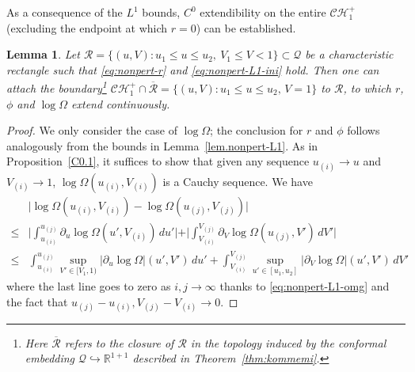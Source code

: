 \documentclass[10pt, reqno]{amsart}
\newtheorem{lemma}[theorem]{Lemma}
\theoremstyle{definition}
\theoremstyle{remark}
\numberwithin{equation}{section}
\newcommand{\abs}[1]{\vert#1\vert}
\newcommand{\set}[1]{\{#1\}}
\newcommand{\rd}{\partial}
\newcommand{\0}{\emptyset}
\newcommand{\Omg}{\Omega}
\newcommand{\bbR}{\mathbb R}
\newcommand{\calC}{\mathcal C}
\newcommand{\calH}{\mathcal H}
\newcommand{\calQ}{\mathcal Q}
\newcommand{\calR}{\mathcal R}
\newcommand{\CH}{\calC \calH^{+}}		%
\begin{document}
As a consequence of the $L^{1}$ bounds, $C^{0}$ extendibility on the entire $\CH_{1}$ (excluding the endpoint at which $r = 0$) can be established.
\begin{lemma} \label{lem.nonpert-C0}
Let $\calR = \set{(u, V) : u_{1} \leq u \leq u_{2}, \ V_{1} \leq V < 1} \subset \calQ$ be a characteristic rectangle such that \eqref{eq:nonpert-r} and \eqref{eq:nonpert-L1-ini} hold. Then one can attach the boundary\footnote{Here $\overline{\calR}$ refers to the closure of $\calR$ in the topology induced by the conformal embedding $\calQ \hookrightarrow \bbR^{1+1}$ described in Theorem~\ref{thm:kommemi}.} $\CH_{1} \cap \overline{\calR} = \set{(u, V) : u_{1} \leq u \leq u_{2}, \, V = 1}$ to $\calR$, to which $r$, $\phi$ and $\log \Omg$ extend continuously. 
\end{lemma}
\begin{proof}
We only consider the case of $\log \Omg$; the conclusion for $r$ and $\phi$ follows analogously from the bounds in Lemma~\ref{lem.nonpert-L1}. As in Proposition~\ref{C0.1}, it suffices to show that given any sequence $u_{(i)} \to u$ and $V_{(i)} \to 1$, $\log \Omg(u_{(i)}, V_{(i)})$ is a Cauchy sequence. We have
\begin{align*}
	& \abs{\log \Omg (u_{(i)}, V_{(i)}) - \log \Omg (u_{(j)}, V_{(j)})} \\
	\leq & \abs{\int_{u_{(i)}}^{u_{(j)}} \rd_{u} \log \Omg(u', V_{(i)}) \, d u' }
		+ \abs{\int_{V_{(i)}}^{V_{(j)}} \rd_{V} \log \Omg(u_{(j)}, V') \, d V'} \\
	\leq & \int_{u_{(i)}}^{u_{(j)}} \sup_{V' \in [V_{1}, 1)} \abs{\rd_{u} \log \Omg}(u', V') \, d u' 
		+ \int_{V_{(i)}}^{V_{(j)}} \sup_{u' \in [u_{1}, u_{2}]} \abs{\rd_{V} \log \Omg}(u', V') \, d V'
\end{align*}
where the last line goes to zero as $i, j \to \infty$ thanks to \eqref{eq:nonpert-L1-omg} and the fact that $u_{(j)} - u_{(i)}, V_{(j)} - V_{(i)} \to 0$. \qedhere
\end{proof}
\end{document}
